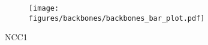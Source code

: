 
\begin{figure}[t]
    \centering
    \def\figwidth{0.99\linewidth } %
    \begin{subfigure}{\figwidth}
        \centering
    {\texttt{[image: figures/backbones/backbones\_bar\_plot.pdf]}}
    \end{subfigure}
    \caption{
        NCC1
        }
    
    \label{fig:ncc:backbones}
    \end{figure}


